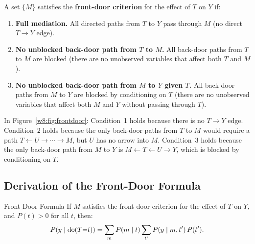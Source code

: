 \documentclass[master.tex]{subfiles}
\begin{document}
\begin{tcolorbox}[defstyle, title={Front-Door Conditions}]
A set $\{M\}$ satisfies the \textbf{front-door criterion} for the
effect of $T$ on $Y$ if:
\begin{enumerate}
  \item \textbf{Full mediation.}  All directed paths from $T$ to $Y$
    pass through $M$ (no direct $T \to Y$ edge).
  \item \textbf{No unblocked back-door path from $T$ to $M$.}
    All back-door paths from $T$ to $M$ are blocked (there are no
    unobserved variables that affect both $T$ and $M$).
  \item \textbf{No unblocked back-door path from $M$ to $Y$ given $T$.}
    All back-door paths from $M$ to $Y$ are blocked by conditioning on
    $T$ (there are no unobserved variables that affect both $M$ and $Y$
    without passing through $T$).
\end{enumerate}
\end{tcolorbox}

In Figure~\ref{w8:fig:frontdoor}: Condition~1 holds because there is no
$T \to Y$ edge.  Condition~2 holds because the only back-door paths
from $T$ to $M$ would require a path $T \leftarrow U \to \cdots \to M$,
but $U$ has no arrow into $M$.  Condition~3 holds because the only
back-door path from $M$ to $Y$ is $M \leftarrow T \leftarrow U \to Y$,
which is blocked by conditioning on $T$.

\subsection{Derivation of the Front-Door Formula}

\begin{thm}{Front-Door Formula \citep{pearl1995causal}}
\label{w8:thm:frontdoor}
If $M$ satisfies the front-door criterion for the effect of $T$ on $Y$,
and $P(t) > 0$ for all $t$, then:
\begin{equation}
  P\!\left(y \mid \mathrm{do}(T{=}t)\right)
  = \sum_m P(m \mid t)
    \sum_{t'} P(y \mid m, t')\, P(t').
  \label{w8:eq:frontdoor}
\end{equation}
\end{thm}
\end{document}
